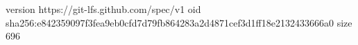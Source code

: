 version https://git-lfs.github.com/spec/v1
oid sha256:e842359097f3fea9eb0cfd7d79fb864283a2d4871cef3d1ff18e2132433666a0
size 696
